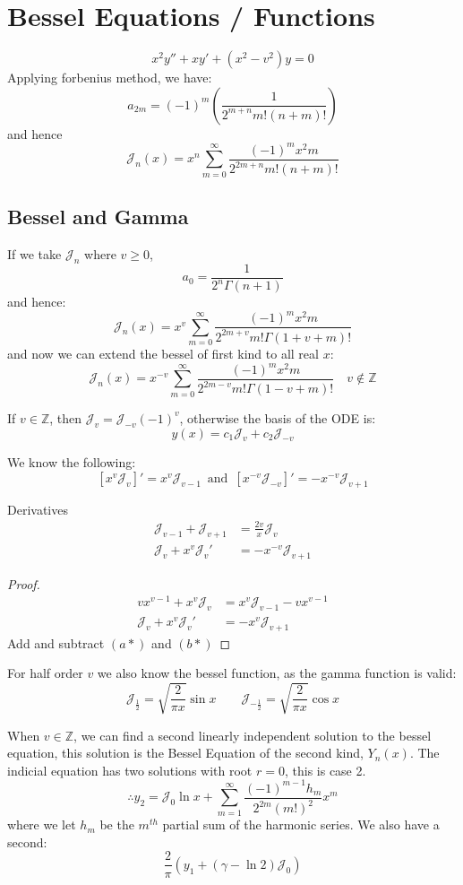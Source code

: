 \documentclass{article}
\newcommand{\Z}{\mathbb{Z}}
\begin{document}
\section{Bessel Equations / Functions}
$$ x^2y'' + xy' + (x^2 -v^2)y = 0 $$
Applying forbenius method, we have:
$$ a_{2m} = (-1)^m\left( \frac{1}{2^{m+n}m!(n + m)!} \right) $$
and hence
$$ \mathcal{J}_n(x) = x^n\sum_{m = 0}^\infty {\frac{(-1)^m x^2m}{2^{2m + n}m!(n + m)!}} $$

\subsection{Bessel and Gamma}
If we take $\mathcal{J}_n$ where $v \geq 0$,
$$ a_0 = \frac{1}{2^n\Gamma{(n + 1)}} $$
and hence:
$$ \mathcal{J}_n(x) = x^v\sum_{m = 0}^\infty {\frac{(-1)^m x^2m}{2^{2m + v}m!\Gamma(1 +v + m)!}} $$
and now we can extend the bessel of first kind to all real $x$:
$$ \mathcal{J}_n(x) = x^{-v}\sum_{m = 0}^\infty {\frac{(-1)^m x^2m}{2^{2m - v}m!\Gamma(1 - v + m)!}} \quad v \notin \Z $$

If $v\in\Z$, then $\mathcal{J}_v = \mathcal{J}_{-v}(-1)^v$, otherwise the basis of the ODE is:
$$ y(x) = c_1\mathcal{J}_v + c_2 \mathcal{J}_{-v} $$

We know the following:
$$ [x^v \mathcal{J}_v]' = x^v \mathcal{J}_{v - 1} \,\text{ and }\, [x^{-v} \mathcal{J}_{-v}]' = -x^{-v} \mathcal{J}_{v + 1} $$

\noindent\begin{theorem}{Derivatives}{}
  \begin{align}
    \mathcal{J}_{v - 1} + \mathcal{J}_{v+1} &= \frac{2v}{x}\mathcal{J}_v \tag{a}\\
    \mathcal{J}_{v} + x^v \mathcal{J}_v' &= - x^{-v} \mathcal{J}_{v + 1} \tag{b}
  \end{align}
\end{theorem}\vspace{10pt}

\begin{proof}
  \begin{align}
    vx^{v - 1} + x^v \mathcal{J}_v &= x^v \mathcal{J}_{v-1} - vx^{v-1} \tag{$a*$} \\
    \mathcal{J}_v + x^v \mathcal{J}_v' &= -x^v \mathcal{J}_{v+1} \tag{$b*$}
  \end{align}
  Add and subtract $(a*)$ and $(b*)$
\end{proof}

For half order $v$ we also know the bessel function, as the gamma function is valid:
$$ \mathcal{J}_{\frac{1}{2}} = \sqrt{\frac{2}{\pi x}}\sin x \qquad \mathcal{J}_{-\frac{1}{2}} = \sqrt{\frac{2}{\pi x}}\cos x $$

When $v\in\Z$, we can find a second linearly independent solution to the bessel equation, this solution is the Bessel Equation of the second kind, $Y_n(x)$. The indicial equation has two solutions with root $r= 0$, this is case 2.
$$ \therefore y_2 = \mathcal{J}_0\ln x + \sum_{m=1}^\infty {\frac{(-1)^{m-1}h_m}{2^{2m}(m!)^2}x^m} $$
where we let $h_m$ be the $m^{th}$ partial sum of the harmonic series. We also have a second:
$$ \frac{2}{\pi}(y_1 + (\gamma - \ln 2)\mathcal{J}_0) $$
\end{document}
